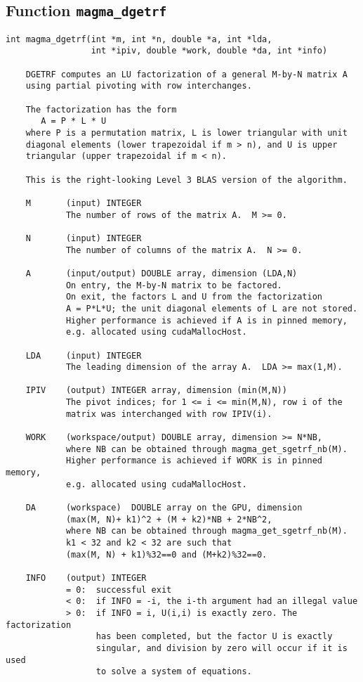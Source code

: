 \documentclass[10pt]{book}
\begin{document}
\newpage
\subsection{Function {\tt {\bf magma\_dgetrf}}}
\begin{verbatim}
int magma_dgetrf(int *m, int *n, double *a, int *lda, 
                 int *ipiv, double *work, double *da, int *info)
   
    DGETRF computes an LU factorization of a general M-by-N matrix A   
    using partial pivoting with row interchanges.   

    The factorization has the form   
       A = P * L * U   
    where P is a permutation matrix, L is lower triangular with unit   
    diagonal elements (lower trapezoidal if m > n), and U is upper   
    triangular (upper trapezoidal if m < n).   

    This is the right-looking Level 3 BLAS version of the algorithm.   

    M       (input) INTEGER   
            The number of rows of the matrix A.  M >= 0.   

    N       (input) INTEGER   
            The number of columns of the matrix A.  N >= 0.   

    A       (input/output) DOUBLE array, dimension (LDA,N)   
            On entry, the M-by-N matrix to be factored.   
            On exit, the factors L and U from the factorization   
            A = P*L*U; the unit diagonal elements of L are not stored.   
            Higher performance is achieved if A is in pinned memory, 
            e.g. allocated using cudaMallocHost.

    LDA     (input) INTEGER   
            The leading dimension of the array A.  LDA >= max(1,M).   

    IPIV    (output) INTEGER array, dimension (min(M,N))   
            The pivot indices; for 1 <= i <= min(M,N), row i of the   
            matrix was interchanged with row IPIV(i).   

    WORK    (workspace/output) DOUBLE array, dimension >= N*NB,
            where NB can be obtained through magma_get_sgetrf_nb(M).
            Higher performance is achieved if WORK is in pinned memory, 
            e.g. allocated using cudaMallocHost.

    DA      (workspace)  DOUBLE array on the GPU, dimension 
            (max(M, N)+ k1)^2 + (M + k2)*NB + 2*NB^2,
            where NB can be obtained through magma_get_sgetrf_nb(M).
            k1 < 32 and k2 < 32 are such that 
            (max(M, N) + k1)%32==0 and (M+k2)%32==0.

    INFO    (output) INTEGER   
            = 0:  successful exit   
            < 0:  if INFO = -i, the i-th argument had an illegal value   
            > 0:  if INFO = i, U(i,i) is exactly zero. The factorization   
                  has been completed, but the factor U is exactly   
                  singular, and division by zero will occur if it is used   
                  to solve a system of equations.   
\end{verbatim}
\end{document}
